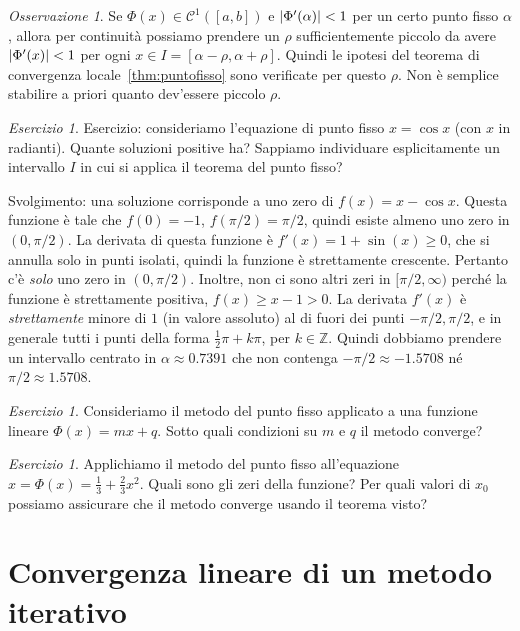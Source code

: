 \documentclass[a4paper]{report}
\DeclarePairedDelimiter{\abs}{\lvert}{\rvert}
\theoremstyle{definiton}
\theoremstyle{remark}
\newtheorem{remark}[theorem]{Osservazione}
\newtheorem{esercizio}[theorem]{Esercizio}
\begin{document}
\begin{remark} \label{oss:corpuntofisso}
    Se $\Phi(x) \in \mathcal{C}^1([a,b])$ e $\abs{\Phi'(\alpha)} < 1$ per un certo punto fisso $\alpha$, allora per continuità possiamo prendere un $\rho$ sufficientemente piccolo da avere $\abs{\Phi'(x)} < 1$ per ogni $x \in I = [\alpha - \rho, \alpha + \rho]$. Quindi le ipotesi del teorema di convergenza locale~\ref{thm:puntofisso} sono verificate per questo $\rho$. Non è semplice stabilire a priori quanto dev'essere piccolo $\rho$.
\end{remark}
    
\begin{esercizio}
Esercizio: consideriamo l'equazione di punto fisso $x = \cos x$ (con $x$ in radianti). Quante soluzioni positive ha? Sappiamo individuare esplicitamente un intervallo $I$ in cui si applica il teorema del punto fisso?
\end{esercizio}

Svolgimento: una soluzione corrisponde a uno zero di $f(x) = x - \cos x$. Questa funzione è tale che $f(0) = -1$, $f(\pi/2) = \pi/2$, quindi esiste almeno uno zero in $(0,\pi/2)$. La derivata di questa funzione è $f'(x) = 1 + \sin(x) \geq 0$, che si annulla solo in punti isolati, quindi la funzione è strettamente crescente. Pertanto c'è \emph{solo} uno zero in $(0,\pi/2)$. Inoltre, non ci sono altri zeri in $[\pi/2, \infty)$ perché la funzione è strettamente positiva, $f(x) \geq x - 1 > 0$. La derivata $f'(x)$ è \emph{strettamente} minore di $1$ (in valore assoluto) al di fuori dei punti $-\pi/2, \pi/2$, e in generale tutti i punti della forma $\frac12 \pi + k\pi$, per $k\in\mathbb{Z}$. Quindi dobbiamo prendere un intervallo centrato in $\alpha \approx 0.7391$ che non contenga $-\pi/2 \approx -1.5708$ né $\pi/2 \approx 1.5708$.

\begin{esercizio}
    Consideriamo il metodo del punto fisso applicato a una funzione lineare $\Phi(x) = mx + q$. Sotto quali condizioni su $m$ e $q$ il metodo converge?
\end{esercizio}
\begin{esercizio}
    Applichiamo il metodo del punto fisso all'equazione $x = \Phi(x) = \frac13 + \frac23 x^2$. Quali sono gli zeri della funzione? Per quali valori di $x_0$ possiamo assicurare che il metodo converge usando il teorema visto?
\end{esercizio}

\section{Convergenza lineare di un metodo iterativo}
\end{document}
